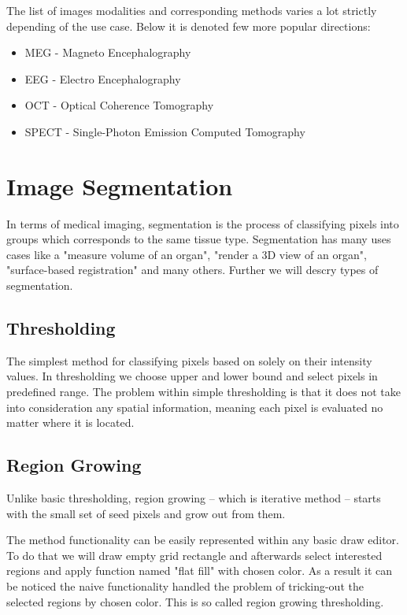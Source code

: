 The list of images modalities and corresponding methods varies a lot strictly depending of the use case.
Below it is denoted few more popular directions:
\begin{itemize}
    \item MEG - Magneto Encephalography
    \item EEG -  Electro Encephalography
    \item OCT -  Optical Coherence Tomography
    \item SPECT -  Single-Photon Emission Computed Tomography
\end{itemize}

\section{Image Segmentation}
In terms of medical imaging, segmentation is the process of classifying pixels into groups which corresponds to the same tissue type. Segmentation has many uses cases like a "measure volume of an organ", "render a 3D view of an organ", "surface-based registration" and many others. Further we will descry types of segmentation. 

\subsection{Thresholding}
The simplest method for classifying pixels based on solely on their intensity values. In thresholding we choose upper and lower bound and select pixels in predefined range.
The problem within simple thresholding is that it does not take into consideration any spatial information, meaning each pixel is evaluated no matter where it is located.    

\subsection{Region Growing}
Unlike basic thresholding, region growing -- which is iterative method -- starts with the small set of seed pixels and grow out from them.

The method functionality can be easily represented within any basic draw editor. To do that we will draw empty grid rectangle and afterwards select interested regions and apply function named "flat fill" with chosen color. As a result it can be noticed the naive functionality handled the problem of tricking-out the selected regions by chosen color. This is so called region growing thresholding.    

